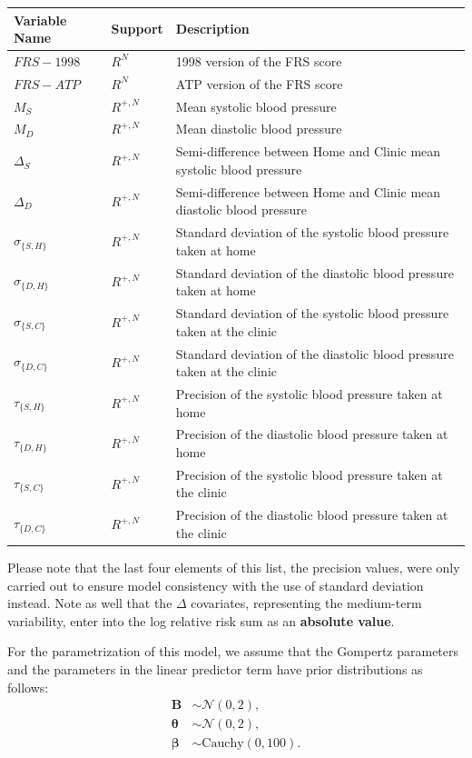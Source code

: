\documentclass[
]{article}
\begin{document}
\begin{tabular}{lll}
\toprule
Variable Name & Support & Description\\
\midrule
$FRS-1998$ & $R^N$ & 1998 version of the FRS score\\
$FRS-ATP$ & $R^N$ & ATP version of the FRS score\\
$M_S$ & $R^{+,N}$ & Mean systolic blood pressure\\
$M_D$ & $R^{+,N}$ & Mean diastolic blood pressure\\
$\Delta_S$ & $R^{+,N}$ & Semi-difference between Home and Clinic mean systolic blood pressure\\
$\Delta_D$ & $R^{+,N}$ & Semi-difference between Home and Clinic mean diastolic blood pressure\\
$\sigma_{\{S,H\}}$ & $R^{+,N}$ & Standard deviation of the systolic blood pressure taken at home\\
$\sigma_{\{D,H\}}$ & $R^{+,N}$ & Standard deviation of the diastolic blood pressure taken at home\\
$\sigma_{\{S,C\}}$ & $R^{+,N}$ & Standard deviation of the systolic blood pressure taken at the clinic\\
$\sigma_{\{D,C\}}$ & $R^{+,N}$ & Standard deviation of the diastolic blood pressure taken at the clinic\\
$\tau_{\{S,H\}}$ & $R^{+,N}$ & Precision of the systolic blood pressure taken at home\\
$\tau_{\{D,H\}}$ & $R^{+,N}$ & Precision of the diastolic blood pressure taken at home\\
$\tau_{\{S,C\}}$ & $R^{+,N}$ & Precision of the systolic blood pressure taken at the clinic\\
$\tau_{\{D,C\}}$ & $R^{+,N}$ & Precision of the diastolic blood pressure taken at the clinic\\
\bottomrule
\end{tabular}

Please note that the last four elements of this list, the precision values, were only carried out to ensure model consistency with the use of standard deviation instead.
Note as well that the \(\Delta\) covariates, representing the medium-term variability, enter into the log relative risk sum as an \textbf{absolute value}.

For the parametrization of this model, we assume that the Gompertz parameters and the parameters in the linear predictor term have prior distributions as follows:
\begin{equation}\label{priorsS}
\begin{split}
  \boldsymbol{B}&\sim\mathcal{N}(0,2),\\
  \boldsymbol{\theta}&\sim\mathcal{N}(0,2),\\
  \boldsymbol{\beta}&\sim \mathrm{Cauchy}(0,100).
\end{split}
\end{equation}
\end{document}
